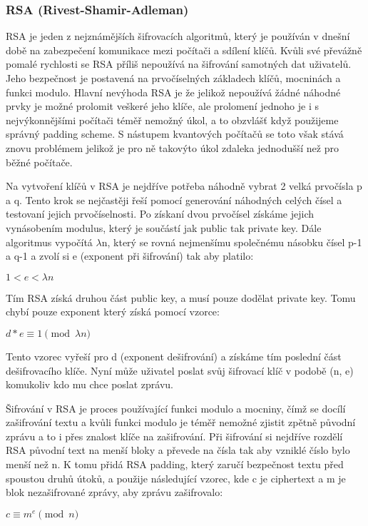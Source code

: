 \documentclass[12pt,a4paper]{report}
\begin{document}
\subsubsection{RSA (Rivest-Shamir-Adleman)}
RSA je jeden z nejznámějších šifrovacích algoritmů, který je používán v dnešní době na zabezpečení komunikace mezi počítači a sdílení klíčů. Kvůli své převážně pomalé rychlosti se RSA příliš nepoužívá na šifrování samotných dat uživatelů. Jeho bezpečnost je postavená na prvočíselných základech klíčů, mocninách a funkci modulo. Hlavní nevýhoda RSA je že jelikož nepoužívá žádné náhodné prvky je možné prolomit veškeré jeho klíče, ale prolomení jednoho je i s nejvýkonnějšími počítači téměř nemožný úkol, a to obzvlášť když použijeme správný padding scheme. S nástupem kvantových počítačů se toto však stává znovu problémem jelikož je pro ně takovýto úkol zdaleka jednodušší než pro běžné počítače.

Na vytvoření klíčů v RSA je nejdříve potřeba náhodně vybrat 2 velká prvočísla p a q. Tento krok se nejčastěji řeší pomocí generování náhodných celých čísel a testovaní jejich prvočíselnosti. Po získaní dvou prvočísel získáme jejich vynásobením modulus, který je součástí jak public tak private key. Dále algoritmus vypočítá $\lambda$n, který se rovná nejmenšímu společnému násobku čísel p-1 a q-1 a zvolí si e (exponent při šifrování) tak aby platilo:

$ 1 < e < \lambda n $

Tím RSA získá druhou část public key, a musí pouze dodělat private key. Tomu chybí pouze exponent který získá pomocí vzorce:

$ d*e \equiv 1 \pmod {\lambda n}$

Tento vzorec vyřeší pro d (exponent dešifrování) a získáme tím poslední část dešifrovacího klíče. Nyní může uživatel poslat svůj šifrovací klíč v podobě (n, e) komukoliv kdo mu chce poslat zprávu.

\newpage

Šifrování v RSA je proces používající funkci modulo a mocniny, čímž se docílí zašifrování textu a kvůli funkci modulo je téměř nemožné zjistit zpětně původní zprávu a to i přes znalost klíče na zašifrování. Při šifrování si nejdříve rozdělí RSA původní text na menší bloky a převede na čísla tak aby vzniklé číslo bylo menší než n. K tomu přidá RSA padding, který zaručí bezpečnost textu před spoustou druhů útoků, a použije následující vzorec, kde c je ciphertext a m je blok nezašifrované zprávy, aby zprávu zašifrovalo: 

$ c \equiv m^e \pmod n$
\end{document}
